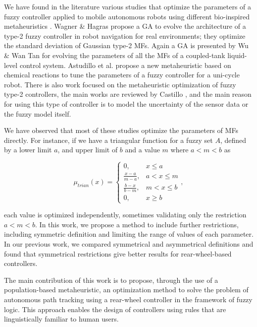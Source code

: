 \documentclass[symmetry,article,submit,moreauthors,pdftex]{Definitions/mdpi}
\begin{document}
We have found in the literature various studies that optimize the parameters of
a fuzzy controller applied to mobile autonomous robots using different
bio-inspired metaheuristics
\cite{hernandez_optimization_2019,lagunes_methodology_2017}.  Wagner \& Hagras
\cite{wagner2007genetic} propose a GA to evolve the architecture of a type-2
fuzzy controller in robot navigation for real environments; they optimize the
standard deviation of Gaussian type-2 MFs.  Again a GA is presented by Wu \&
Wan Tan \cite{wu2006genetic} for evolving the parameters of all the MFs of a
coupled-tank liquid-level control system.  Astudillo et al.
\cite{astudillo2013optimization} propose a new metaheuristic based on chemical
reactions to tune the parameters of a fuzzy controller for a uni-cycle robot.
There is also work focused on the metaheuristic optimization of fuzzy type-2
controllers, the main works are reviewed by Castillo
\cite{castillo_review_2012}, and the main reason for using this type of
controller is to model the uncertainty of the sensor data or the fuzzy model
itself.


We have observed that most of these studies optimize the parameters of MFs
directly. For instance, if we have a triangular function for a fuzzy set $A$,
defined by a lower limit $a$, and upper limit of $b$ and a value $m$ where $a <
m <b$ as 

\begin{equation}\label{eq:triangular}
\mu_{trian}(x) = 
\begin{cases}
    0, & x \le a \\
    \frac{x-a}{m-a}, & a < x \le m \\ 
    \frac{b-x}{b-m}, & m < x \le b \\ 
    0, & x \ge b
\end{cases},
\end{equation}

each value is optimized independently, sometimes validating only the
restriction $a < m <b$. In this work, we propose a method to include further
restrictions, including symmetric definition and limiting the range of values
of each parameter. In our previous work, we compared symmetrical and
asymmetrical definitions and found that symmetrical restrictions give better
results for rear-wheel-based controllers. 

The main contribution of this work is to propose, through the use of a
population-based metaheuristic, an optimization method to solve the problem of
autonomous path tracking using a rear-wheel controller in the framework of
fuzzy logic. This approach enables the design of controllers using rules that
are linguistically familiar to human users.
\end{document}
